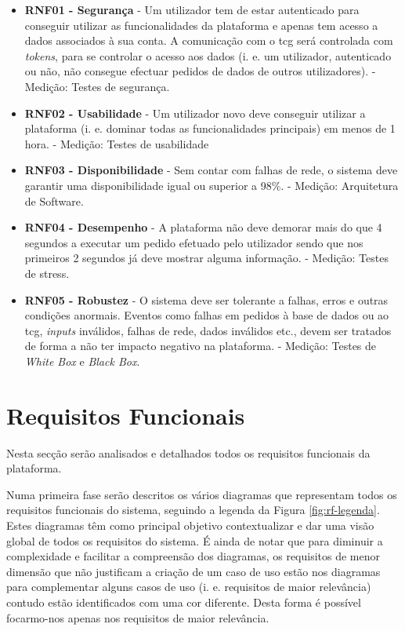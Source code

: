 \begin{itemize}
	\item \textbf{RNF01 - Segurança}
	\subitem - Um utilizador tem de estar autenticado para conseguir utilizar as funcionalidades da plataforma e apenas tem acesso a dados associados à sua conta. A comunicação com o \acrshort{tcg} será controlada com \textit{tokens}, para se controlar o acesso aos dados (i. e. um utilizador, autenticado ou não, não consegue efectuar pedidos de dados de outros utilizadores).
	\subitem - Medição: Testes de segurança.
	
	\item \textbf{RNF02 - Usabilidade} 
	\subitem - Um utilizador novo deve conseguir utilizar a plataforma (i. e. dominar todas as funcionalidades principais) em menos de 1 hora.
	\subitem - Medição: Testes de usabilidade
	
	\item \textbf{RNF03 - Disponibilidade}
	\subitem - Sem contar com falhas de rede, o sistema deve garantir uma disponibilidade  igual ou superior a 98\%.
	\subitem - Medição: Arquitetura de Software.
	
	\item \textbf{RNF04 - Desempenho}
	\subitem - A plataforma não deve demorar mais do que 4 segundos a executar um pedido efetuado pelo utilizador sendo que nos primeiros 2 segundos já deve mostrar alguma informação.
	\subitem - Medição: Testes de stress.
	
	\item \textbf{RNF05 - Robustez}
	\subitem - O sistema deve ser tolerante a falhas, erros e outras condições anormais. Eventos como falhas em pedidos à base de dados ou ao \acrshort{tcg}, \textit{inputs} inválidos, falhas de rede, dados inválidos etc., devem ser tratados de forma a não ter impacto negativo na plataforma.
	\subitem - Medição: Testes de \textit{White Box} e \textit{Black Box}.
\end{itemize}


\section{Requisitos Funcionais}
\label{rf}

Nesta secção serão analisados e detalhados todos os requisitos funcionais da plataforma.

Numa primeira fase serão descritos os vários diagramas que representam todos os requisitos funcionais do sistema, seguindo a legenda da Figura \ref{fig:rf-legenda}. Estes diagramas têm como principal objetivo contextualizar e dar uma visão global de todos os requisitos do sistema. É ainda de notar que para diminuir a complexidade e facilitar a compreensão dos diagramas, os requisitos de menor dimensão que não justificam a criação de um caso de uso estão nos diagramas para complementar alguns casos de uso (i. e. requisitos de maior relevância) contudo estão identificados com uma cor diferente. Desta forma é possível focarmo-nos apenas nos requisitos de maior relevância.

